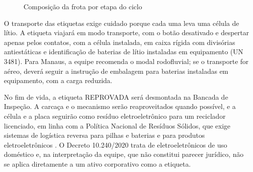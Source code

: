 \begin{figure}[htbp]
    \centering
    \caption{Composição da frota por etapa do ciclo}
    \label{fig:r2-frota}
\end{figure}

O transporte das etiquetas exige cuidado porque cada uma leva uma célula de lítio. A etiqueta viajará em modo transporte, com o botão desativado e despertar apenas pelos contatos, com a célula instalada, em caixa rígida com divisórias antiestáticas e identificação de baterias de lítio instaladas em equipamento (UN 3481). Para Manaus, a equipe recomenda o modal rodofluvial; se o transporte for aéreo, deverá seguir a instrução de embalagem para baterias instaladas em equipamento, com a carga reduzida.

No fim de vida, a etiqueta REPROVADA será desmontada na Bancada de Inspeção. A carcaça e o mecanismo serão reaproveitados quando possível, e a célula e a placa seguirão como resíduo eletroeletrônico para um reciclador licenciado, em linha com a Política Nacional de Resíduos Sólidos, que exige sistemas de logística reversa para pilhas e baterias e para produtos eletroeletrônicos \cite{brasil2010pnrs}. O Decreto 10.240/2020 trata de eletroeletrônicos de uso doméstico \cite{brasil2020decreto} e, na interpretação da equipe, que não constitui parecer jurídico, não se aplica diretamente a um ativo corporativo como a etiqueta.

